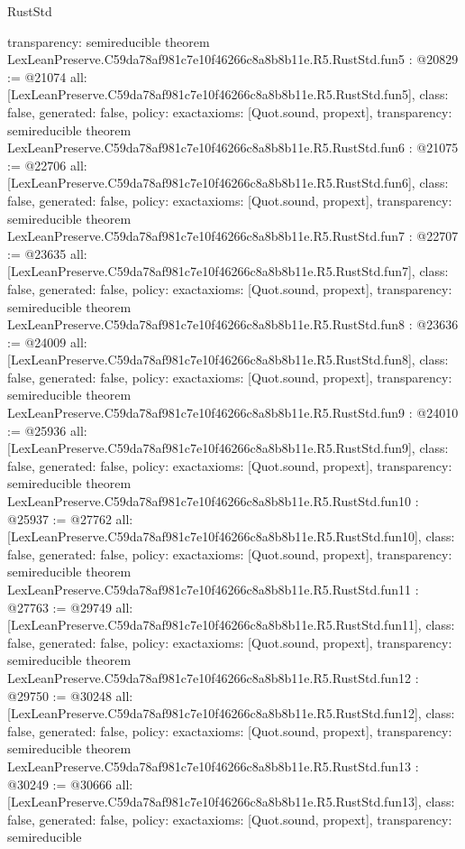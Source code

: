 \begin{lexlean}{RustStd}
\begin{coremodule}
{  transparency: semireducible
}
theorem LexLeanPreserve.C59da78af981c7e10f46266c8a8b8b11e.R5.RustStd.fun5 : @20829 := @21074 {
  all: [LexLeanPreserve.C59da78af981c7e10f46266c8a8b8b11e.R5.RustStd.fun5],
  class: false,
  generated: false,
  policy: exact{axioms: [Quot.sound, propext]},
  transparency: semireducible
}
theorem LexLeanPreserve.C59da78af981c7e10f46266c8a8b8b11e.R5.RustStd.fun6 : @21075 := @22706 {
  all: [LexLeanPreserve.C59da78af981c7e10f46266c8a8b8b11e.R5.RustStd.fun6],
  class: false,
  generated: false,
  policy: exact{axioms: [Quot.sound, propext]},
  transparency: semireducible
}
theorem LexLeanPreserve.C59da78af981c7e10f46266c8a8b8b11e.R5.RustStd.fun7 : @22707 := @23635 {
  all: [LexLeanPreserve.C59da78af981c7e10f46266c8a8b8b11e.R5.RustStd.fun7],
  class: false,
  generated: false,
  policy: exact{axioms: [Quot.sound, propext]},
  transparency: semireducible
}
theorem LexLeanPreserve.C59da78af981c7e10f46266c8a8b8b11e.R5.RustStd.fun8 : @23636 := @24009 {
  all: [LexLeanPreserve.C59da78af981c7e10f46266c8a8b8b11e.R5.RustStd.fun8],
  class: false,
  generated: false,
  policy: exact{axioms: [Quot.sound, propext]},
  transparency: semireducible
}
theorem LexLeanPreserve.C59da78af981c7e10f46266c8a8b8b11e.R5.RustStd.fun9 : @24010 := @25936 {
  all: [LexLeanPreserve.C59da78af981c7e10f46266c8a8b8b11e.R5.RustStd.fun9],
  class: false,
  generated: false,
  policy: exact{axioms: [Quot.sound, propext]},
  transparency: semireducible
}
theorem LexLeanPreserve.C59da78af981c7e10f46266c8a8b8b11e.R5.RustStd.fun10 : @25937 := @27762 {
  all: [LexLeanPreserve.C59da78af981c7e10f46266c8a8b8b11e.R5.RustStd.fun10],
  class: false,
  generated: false,
  policy: exact{axioms: [Quot.sound, propext]},
  transparency: semireducible
}
theorem LexLeanPreserve.C59da78af981c7e10f46266c8a8b8b11e.R5.RustStd.fun11 : @27763 := @29749 {
  all: [LexLeanPreserve.C59da78af981c7e10f46266c8a8b8b11e.R5.RustStd.fun11],
  class: false,
  generated: false,
  policy: exact{axioms: [Quot.sound, propext]},
  transparency: semireducible
}
theorem LexLeanPreserve.C59da78af981c7e10f46266c8a8b8b11e.R5.RustStd.fun12 : @29750 := @30248 {
  all: [LexLeanPreserve.C59da78af981c7e10f46266c8a8b8b11e.R5.RustStd.fun12],
  class: false,
  generated: false,
  policy: exact{axioms: [Quot.sound, propext]},
  transparency: semireducible
}
theorem LexLeanPreserve.C59da78af981c7e10f46266c8a8b8b11e.R5.RustStd.fun13 : @30249 := @30666 {
  all: [LexLeanPreserve.C59da78af981c7e10f46266c8a8b8b11e.R5.RustStd.fun13],
  class: false,
  generated: false,
  policy: exact{axioms: [Quot.sound, propext]},
  transparency: semireducible
}
\end{coremodule}
\end{lexlean}
